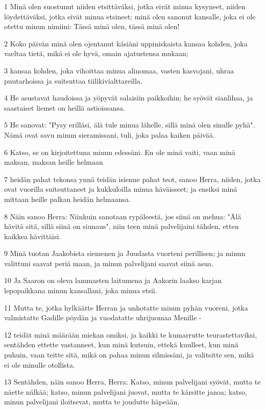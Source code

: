 \par 1 Minä olen suostunut niiden etsittäväksi, jotka eivät minua kysyneet, niiden löydettäväksi, jotka eivät minua etsineet; minä olen sanonut kansalle, joka ei ole otettu minun nimiini: Tässä minä olen, tässä minä olen!
\par 2 Koko päivän minä olen ojentanut käsiäni uppiniskaista kansaa kohden, joka vaeltaa tietä, mikä ei ole hyvä, omain ajatustensa mukaan;
\par 3 kansaa kohden, joka vihoittaa minua alinomaa, vasten kasvojani, uhraa puutarhoissa ja suitsuttaa tiilikivialttareilla.
\par 4 He asustavat haudoissa ja yöpyvät salaisiin paikkoihin; he syövät sianlihaa, ja saastaiset liemet on heillä astioissansa.
\par 5 He sanovat: "Pysy erilläsi, älä tule minua lähelle, sillä minä olen sinulle pyhä". Nämä ovat savu minun sieramissani, tuli, joka palaa kaiken päivää.
\par 6 Katso, se on kirjoitettuna minun edessäni. En ole minä vaiti, vaan minä maksan, maksan heille helmaan
\par 7 heidän pahat tekonsa ynnä teidän isienne pahat teot, sanoo Herra, niiden, jotka ovat vuorilla suitsuttaneet ja kukkuloilla minua häväisseet; ja ensiksi minä mittaan heille palkan heidän helmaansa.
\par 8 Näin sanoo Herra: Niinkuin sanotaan rypäleestä, jos siinä on mehua: "Älä hävitä sitä, sillä siinä on siunaus", niin teen minä palvelijaini tähden, etten kaikkea hävittäisi.
\par 9 Minä tuotan Jaakobista siemenen ja Juudasta vuorteni perillisen; ja minun valittuni saavat periä maan, ja minun palvelijani saavat siinä asua.
\par 10 Ja Saaron on oleva lammasten laitumena ja Aakorin laakso karjan lepopaikkana minun kansallani, joka minua etsii.
\par 11 Mutta te, jotka hylkäätte Herran ja unhotatte minun pyhän vuoreni, jotka valmistatte Gadille pöydän ja vuodatatte uhrijuomaa Menille -
\par 12 teidät minä määrään miekan omiksi, ja kaikki te kumarrutte teurastettaviksi, sentähden ettette vastanneet, kun minä kutsuin, ettekä kuulleet, kun minä puhuin, vaan teitte sitä, mikä on pahaa minun silmissäni, ja valitsitte sen, mikä ei ole minulle otollista.
\par 13 Sentähden, näin sanoo Herra, Herra: Katso, minun palvelijani syövät, mutta te näette nälkää; katso, minun palvelijani juovat, mutta te kärsitte janoa; katso, minun palvelijani iloitsevat, mutta te joudutte häpeään.
